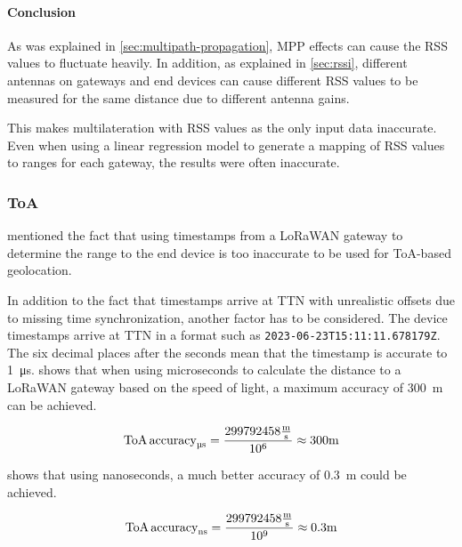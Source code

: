 \paragraph{Conclusion}

As was explained in \cref{sec:multipath-propagation}, \acl{MPP} effects can cause the \ac{RSS} values to fluctuate heavily.
In addition, as explained in \cref{sec:rssi}, different antennas on gateways and end devices can cause different \ac{RSS} values to be measured for the same distance due to different antenna gains.

This makes multilateration with \ac{RSS} values as the only input data inaccurate.
Even when using a linear regression model to generate a mapping of \ac{RSS} values to ranges for each gateway, the results were often inaccurate.

\subsubsection{\acf{ToA}}\label{subsec:conclusion-toa-tdoa}

 mentioned the fact that using timestamps from a \ac{LoRaWAN} gateway to determine the range to the end device is too inaccurate to be used for \ac{ToA}-based geolocation.

In addition to the fact that timestamps arrive at \ac{TTN} with unrealistic offsets due to missing time synchronization, another factor has to be considered.
The device timestamps arrive at \ac{TTN} in a format such as \texttt{2023-06-23T15:11:11.678179Z}.
The six decimal places after the seconds mean that the timestamp is accurate to \SI{1}{\micro\second}.
 shows that when using microseconds to calculate the distance to a \ac{LoRaWAN} gateway based on the speed of light, a maximum accuracy of \SI{300}{\meter} can be achieved.

\begin{equation}\label{eq:toa-accuracy-ttn-microseconds}
    \text{ToA\,accuracy}_{\si{\micro\second}} = \frac{299792458 \frac{\si{\meter}}{\si{\second}}}{10^6} \approx 300 \si{\meter}
\end{equation}

 shows that using nanoseconds, a much better accuracy of \SI{0.3}{\meter} could be achieved.

\begin{equation}\label{eq:toa-accuracy-ttn-nanoseconds}
    \text{ToA\,accuracy}_{\si{\nano\second}} = \frac{299792458 \frac{\si{\meter}}{\si{\second}}}{10^9} \approx 0.3 \si{\meter}
\end{equation}

